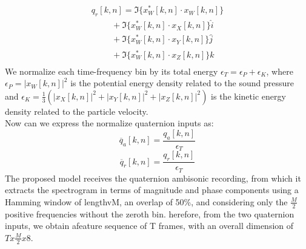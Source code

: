 \documentclass{article}
\begin{document}
    \begin{equation*}
        \begin{matrix}
            q_r[k,n]=\Im\{x_W^*[k,n]\cdot x_W[k,n]\} \\
            \hspace{1cm} + \Im\{x_W^*[k,n]\cdot x_X[k,n]\}\hat{i} \\
            \hspace{1cm} + \Im\{x_W^*[k,n] \cdot x_Y[k,n]\}\hat{j} \\
            \hspace{1cm} + \Im\{x_W^*[k,n]\cdot x_Z[k,n]\}\hat{k} \\
        \end{matrix}
    \end{equation*}
    We normalize each time-frequency bin by its total energy $\epsilon_T=\epsilon_P+\epsilon_K$, where $\epsilon_P=|x_W[k, n]|^2$ 
    is the potential energy density related to the sound pressure and $\epsilon_K=\frac{1}{3}(|x_X[k, n]|^2+|x_Y[k, n]|^2+|x_Z[k, n]|^2)$ 
    is the kinetic energy density related to the particle velocity.
    \\ Now can we express the normalize quaternion inputs as:
    \begin{equation*}
        \overline{q}_a [k,n] = \frac{q_a[k,n]}{\epsilon_T} 
    \end{equation*}
    \begin{equation*}
        \overline{q}_r [k,n] = \frac{q_r[k,n]}{\epsilon_T} 
    \end{equation*}
    The proposed model receives the quaternion ambisonic recording, from which it extracts the spectrogram in terms of magnitude and phase
    components using a Hamming window of lengthvM, an overlap of 50\%, and considering only the $\frac{M}{2}$ positive frequencies without the 
    zeroth bin. herefore, from the two quaternion inputs, we obtain afeature sequence of T frames, with an overall dimension of $Tx\frac{M}{2}x8$.
\end{document}
